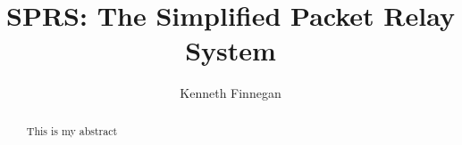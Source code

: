 \documentclass{report}
\begin{document}
\title{SPRS: The Simplified Packet Relay System}
\author{Kenneth Finnegan}
\maketitle

\begin{abstract}
This is my abstract
\end{abstract}

\tableofcontents



\end{document}
